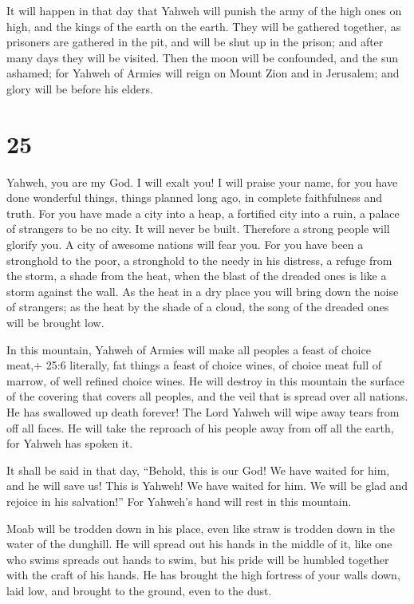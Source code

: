  It will happen in that day that Yahweh will punish the
army of the high ones on high, and the kings of the earth on the earth.
 They will be gathered together, as prisoners are gathered
in the pit, and will be shut up in the prison; and after many days they
will be visited.  Then the moon will be confounded, and the
sun ashamed; for Yahweh of Armies will reign on Mount Zion and in
Jerusalem; and glory will be before his elders.

\hypertarget{section-24}{%
\section{25}\label{section-24}}

 Yahweh, you are my God. I will exalt you! I will praise
your name, for you have done wonderful things, things planned long ago,
in complete faithfulness and truth.  For you have made a
city into a heap, a fortified city into a ruin, a palace of strangers to
be no city. It will never be built.  Therefore a strong
people will glorify you. A city of awesome nations will fear you.
 For you have been a stronghold to the poor, a stronghold to
the needy in his distress, a refuge from the storm, a shade from the
heat, when the blast of the dreaded ones is like a storm against the
wall.  As the heat in a dry place you will bring down the
noise of strangers; as the heat by the shade of a cloud, the song of the
dreaded ones will be brought low.

 In this mountain, Yahweh of Armies will make all peoples a
feast of choice meat,+ 25:6 literally, fat things a feast of choice
wines, of choice meat full of marrow, of well refined choice wines.
 He will destroy in this mountain the surface of the
covering that covers all peoples, and the veil that is spread over all
nations.  He has swallowed up death forever! The Lord Yahweh
will wipe away tears from off all faces. He will take the reproach of
his people away from off all the earth, for Yahweh has spoken it.

 It shall be said in that day, ``Behold, this is our God! We
have waited for him, and he will save us! This is Yahweh! We have waited
for him. We will be glad and rejoice in his salvation!'' 
For Yahweh's hand will rest in this mountain.

Moab will be trodden down in his place, even like straw is trodden down
in the water of the dunghill.  He will spread out his hands
in the middle of it, like one who swims spreads out hands to swim, but
his pride will be humbled together with the craft of his hands.
 He has brought the high fortress of your walls down, laid
low, and brought to the ground, even to the dust.

